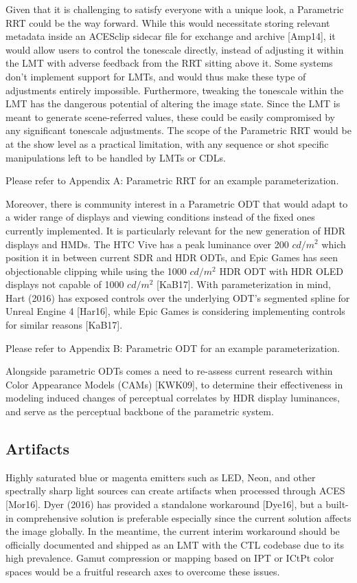\documentclass[conference]{IEEEtran}
\begin{document}
Given that it is challenging to satisfy everyone with a unique look, a Parametric RRT could be the way forward. While this would necessitate storing relevant metadata inside an ACESclip sidecar file for exchange and archive [Amp14], it would allow users to control the tonescale directly, instead of adjusting it within the LMT with adverse feedback from the RRT sitting above it. Some systems don't implement support for LMTs, and would thus make these type of adjustments entirely impossible. Furthermore, tweaking the tonescale within the LMT has the dangerous potential of altering the image state. Since the LMT is meant to generate scene-referred values, these could be easily compromised by any significant tonescale adjustments. The scope of the Parametric RRT would be at the show level as a practical limitation, with any sequence or shot specific manipulations left to be handled by LMTs or CDLs.

Please refer to Appendix A: Parametric RRT for an example parameterization.

Moreover, there is community interest in a Parametric ODT that would adapt to a wider range of displays and viewing conditions instead of the fixed ones currently implemented. It is particularly relevant for the new generation of HDR displays and HMDs. The HTC Vive has a peak luminance over 200 $cd/m^2$ which position it in between current SDR and HDR ODTs, and Epic Games has seen objectionable clipping while using the 1000 $cd/m^2$ HDR ODT with HDR OLED displays not capable of 1000 $cd/m^2$ [KaB17]. With parameterization in mind, Hart (2016) has exposed controls over the underlying ODT's segmented spline for Unreal Engine 4 [Har16], while Epic Games is considering implementing controls for similar reasons [KaB17].

Please refer to Appendix B: Parametric ODT for an example parameterization.

Alongside parametric ODTs comes a need to re-assess current research within Color Appearance Models (CAMs) [KWK09], to determine their effectiveness in modeling induced changes of perceptual correlates by HDR display luminances, and serve as the perceptual backbone of the parametric system.

\subsection{Artifacts}
Highly saturated blue or magenta emitters such as LED, Neon, and other spectrally sharp light sources can create artifacts when processed through ACES [Mor16]. Dyer (2016) has provided a standalone workaround [Dye16], but a built-in comprehensive solution is preferable especially since the current solution affects the image globally. In the meantime, the current interim workaround should be officially documented and shipped as an LMT with the CTL codebase due to its high prevalence. Gamut compression or mapping based on IPT or ICtPt color spaces would be a fruitful research axes to overcome these issues.
\end{document}
